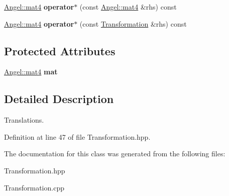 \begin{DoxyCompactItemize}
\item 
\hypertarget{class_transformation_afdfbf48815a5b0d885f3b93f04cd2c66}{\hyperlink{class_angel_1_1mat4}{Angel\-::mat4} {\bfseries operator$\ast$} (const \hyperlink{class_angel_1_1mat4}{Angel\-::mat4} \&rhs) const }\label{class_transformation_afdfbf48815a5b0d885f3b93f04cd2c66}

\item 
\hypertarget{class_transformation_a85b923e0066365ef2e4aec3671396410}{\hyperlink{class_angel_1_1mat4}{Angel\-::mat4} {\bfseries operator$\ast$} (const \hyperlink{class_transformation}{Transformation} \&rhs) const }\label{class_transformation_a85b923e0066365ef2e4aec3671396410}

\end{DoxyCompactItemize}
\subsection*{Protected Attributes}
\begin{DoxyCompactItemize}
\item 
\hypertarget{class_transformation_a5f39fb578a1cdf78ca85efbd932d3834}{\hyperlink{class_angel_1_1mat4}{Angel\-::mat4} {\bfseries mat}}\label{class_transformation_a5f39fb578a1cdf78ca85efbd932d3834}

\end{DoxyCompactItemize}


\subsection{Detailed Description}
Translations. 

Definition at line 47 of file Transformation.\-hpp.



The documentation for this class was generated from the following files\-:\begin{DoxyCompactItemize}
\item 
Transformation.\-hpp\item 
Transformation.\-cpp\end{DoxyCompactItemize}
